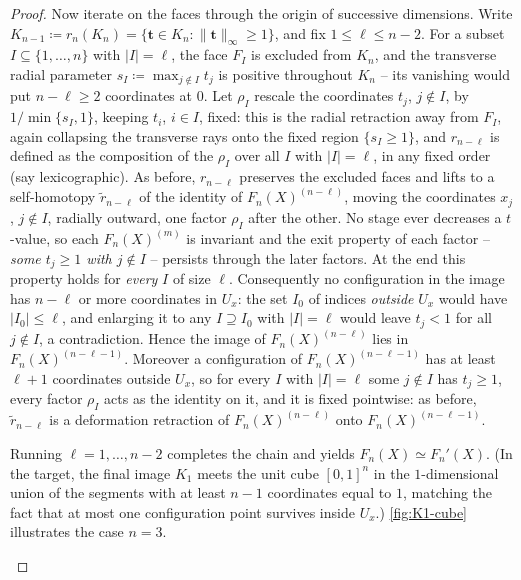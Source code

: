 \documentclass[reqno]{amsart}
\theoremstyle{definition}
\newcommand\bft{\mathbf{t}}
\renewcommand{\tilde}{\widetilde}
\numberwithin{equation}{section}
\begin{document}
\begin{proof}
Now iterate on the faces through the origin of successive
dimensions. Write
\(K_{n-1}\coloneqq r_n(K_n)=\{\bft\in K_n:\|\bft\|_\infty\ge1\}\),
and fix \(1\le \ell\le n-2\). For a subset
\(I\subseteq\{1,\dots,n\}\) with \(|I|=\ell\), the face \(F_I\)
is excluded from \(K_n\), and the transverse radial parameter
\(s_I\coloneqq\max_{j\notin I}t_j\) is positive throughout
\(K_n\) -- its vanishing would put \(n-\ell\ge2\) coordinates at
\(0\). Let \(\rho_I\) rescale the coordinates \(t_j\),
\(j\notin I\), by \(1/\min\{s_I,1\}\), keeping \(t_i\), \(i\in
I\), fixed: this is the radial retraction away from \(F_I\),
again collapsing the transverse rays onto the fixed region
\(\{s_I\ge1\}\), and \(r_{n-\ell}\) is defined
as the composition of the \(\rho_I\) over all \(I\) with
\(|I|=\ell\), in any fixed order (say lexicographic). As before,
\(r_{n-\ell}\) preserves the excluded faces and lifts to a
self-homotopy \(\tilde r_{n-\ell}\) of the identity of
\(F_n(X)^{(n-\ell)}\), moving the coordinates \(x_j\),
\(j\notin I\), radially outward, one factor \(\rho_I\) after the
other. No stage ever decreases a \(t\)-value, so each
\(F_n(X)^{(m)}\) is invariant and the exit property of each
factor -- \emph{some \(t_j\ge1\) with \(j\notin I\)} -- persists
through the later factors. At the end this property holds for
\emph{every} \(I\) of size \(\ell\). Consequently no
configuration in the image has \(n-\ell\) or more coordinates in
\(U_x\): the set \(I_0\) of indices \emph{outside} \(U_x\) would
have \(|I_0|\le\ell\), and enlarging it to any \(I\supseteq I_0\)
with \(|I|=\ell\) would leave \(t_j<1\) for all \(j\notin I\), a
contradiction. Hence the image of \(F_n(X)^{(n-\ell)}\) lies in
\(F_n(X)^{(n-\ell-1)}\). Moreover a configuration of
\(F_n(X)^{(n-\ell-1)}\) has at least \(\ell+1\) coordinates
outside \(U_x\), so for every \(I\) with \(|I|=\ell\) some
\(j\notin I\) has \(t_j\ge1\), every factor \(\rho_I\) acts as
the identity on it, and it is fixed pointwise: as before,
\(\tilde r_{n-\ell}\) is a deformation retraction of
\(F_n(X)^{(n-\ell)}\) onto \(F_n(X)^{(n-\ell-1)}\).

Running \(\ell=1,\dots,n-2\) completes the chain and yields
\(F_n(X)\simeq F_n'(X)\). (In the target, the final image
\(K_1\) meets the unit cube \([0,1]^n\) in the \(1\)-dimensional
union of the segments with at least \(n-1\) coordinates equal to
\(1\), matching the fact that at most one configuration point
survives inside \(U_x\).) \cref{fig:K1-cube} illustrates the
case \(n=3\).

\begin{figure}[ht]
\centering
\begin{tikzpicture}[line width=0.8pt, scale=0.9]


\end{tikzpicture}
\end{figure}
\end{proof}
\end{document}
